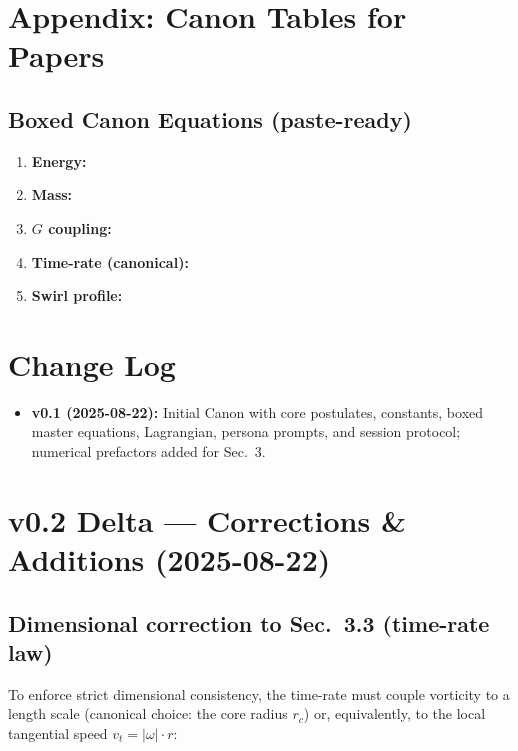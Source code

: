 \documentclass[11pt, a4paper]{article}
\begin{document}
\section{Appendix: Canon Tables for Papers}


\subsection*{Boxed Canon Equations (paste-ready)}

\begin{enumerate}
    \item \textbf{Energy:} 
    \item \textbf{Mass:} 
    \item \textbf{$G$ coupling:} 
    \item \textbf{Time-rate (canonical):} 
    \item \textbf{Swirl profile:} 
\end{enumerate}

\section{ Change Log}

\begin{itemize}
    \item \textbf{v0.1 (2025-08-22):} Initial Canon with core postulates, constants, boxed master equations, Lagrangian, persona prompts, and session protocol; numerical prefactors added for Sec.~3.
\end{itemize}

\section{v0.2 Delta --- Corrections \& Additions (2025-08-22)}

\subsection*{ Dimensional correction to Sec.~3.3 (time-rate law)}

To enforce strict dimensional consistency, the time-rate must couple vorticity to a length scale (canonical choice: the core radius $r_c$) or, equivalently, to the local tangential speed $v_t = |\omega| \cdot r$:
\end{document}
